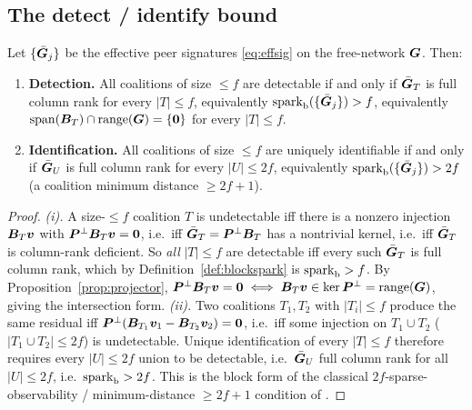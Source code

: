\subsection{The detect / identify bound}
\label{sec:bound}

\begin{theorem}
\label{thm:byzantine}
Let $\{\bar{\bm{G}}_j\}$ be the effective peer signatures \eqref{eq:effsig} on the free-network
$\bm{G}$. Then:
\begin{enumerate}
  \item[(i)] \textbf{Detection.} All coalitions of size $\le f$ are detectable if and only if
  $\bar{\bm{G}}_T$ is full column rank for every $|T|\le f$, equivalently
  $\operatorname{spark}_{\mathrm b}(\{\bar{\bm{G}}_j\})>f$, equivalently $\operatorname{span}(\bm{B}_T)\cap
  \operatorname{range}(\bm{G})=\{\bm0\}$ for every $|T|\le f$.
  \item[(ii)] \textbf{Identification.} All coalitions of size $\le f$ are uniquely
  identifiable if and only if $\bar{\bm{G}}_U$ is full column rank for every $|U|\le 2f$,
  equivalently $\operatorname{spark}_{\mathrm b}(\{\bar{\bm{G}}_j\})>2f$ (a coalition minimum distance $\ge2f+1$).
\end{enumerate}
\end{theorem}

\begin{proof}
\emph{(i).} A size-$\le f$ coalition $T$ is undetectable iff there is a nonzero injection
$\bm{B}_T\bm v$ with $\bm{P}^{\perp}\bm{B}_T\bm v=\bm0$, i.e.\ iff $\bar{\bm{G}}_T=\bm{P}^{\perp}\bm{B}_T$ has a
nontrivial kernel, i.e.\ iff $\bar{\bm{G}}_T$ is column-rank deficient. So \emph{all}
$|T|\le f$ are detectable iff every such $\bar{\bm{G}}_T$ is full column rank, which by
Definition~\ref{def:blockspark} is $\operatorname{spark}_{\mathrm b}>f$. By
Proposition~\ref{prop:projector}, $\bm{P}^{\perp}\bm{B}_T\bm v=\bm0\iff\bm{B}_T\bm v\in\ker\bm{P}^{\perp}=
\operatorname{range}(\bm{G})$, giving the intersection form. \emph{(ii).} Two coalitions $T_1,T_2$ with
$|T_i|\le f$ produce the same residual iff $\bm{P}^{\perp}(\bm{B}_{T_1}\bm v_1-\bm{B}_{T_2}\bm v_2)=
\bm0$, i.e.\ iff some injection on $T_1\cup T_2$ ($|T_1\cup T_2|\le2f$) is undetectable.
Unique identification of every $|T|\le f$ therefore requires every $|U|\le2f$ union to be
detectable, i.e.\ $\bar{\bm{G}}_U$ full column rank for all $|U|\le2f$, i.e.\ $\operatorname{spark}_{\mathrm
b}>2f$. This is the block form of the classical $2f$-sparse-observability / minimum-distance
$\ge2f+1$ condition of \citep{fawzi2014,shoukry2016,candes2005}.
\end{proof}

